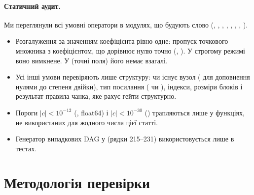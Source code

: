 \documentclass[11pt]{article}
\theoremstyle{plain}
\newcommand{\abs}[1]{\lvert #1\rvert}
\begin{document}
\paragraph{Статичний аудит.}
Ми переглянули всі умовні оператори в модулях, що будують слово (, , , , , , , ).
\begin{itemize}
\item Розгалуження за значенням коефіцієнта рівно одне: пропуск точкового множника з коефіцієнтом, що дорівнює нулю точно (, ). У строгому режимі воно вимкнене. У  (точні поля) його немає взагалі.
\item Усі інші умови перевіряють лише структуру: чи існує вузол ( для доповнення нулями до степеня двійки), тип посилання ( чи ), індекси, розміри блоків і результат правила чанка, яке рахує гейти структурно.
\item Пороги $\abs{c}<10^{-12}$ (, float64) і $\abs{c}<10^{-30}$ () трапляються лише у функціях, не використаних для жодного числа цієї статті.
\item Генератор випадкових DAG у  (рядки 215--231) використовується лише в тестах.
\end{itemize}

\section{Методологія перевірки}\label{sec:method}
\end{document}
